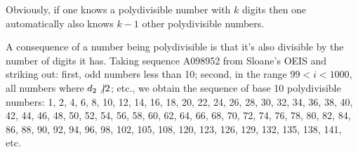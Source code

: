 \documentclass[12pt]{article}
\begin{document}
Obviously, if one knows a polydivisible number with $k$ digits then one automatically also knows $k - 1$ other polydivisible numbers.

A consequence of a number being polydivisible is that it's also divisible by the number of digits it has. Taking sequence A098952 from Sloane's OEIS and striking out: first, odd numbers less than 10; second, in the range $99 < i < 1000$, all numbers where $d_2 \not\vert 2$; etc., we obtain the sequence of base 10 polydivisible numbers: 1, 2, 4, 6, 8, 10, 12, 14, 16, 18, 20, 22, 24, 26, 28, 30, 32, 34, 36, 38, 40, 42, 44, 46, 48, 50, 52, 54, 56, 58, 60, 62, 64, 66, 68, 70, 72, 74, 76, 78, 80, 82, 84, 86, 88, 90, 92, 94, 96, 98, 102, 105, 108, 120, 123, 126, 129, 132, 135, 138, 141, etc.


\end{document}
